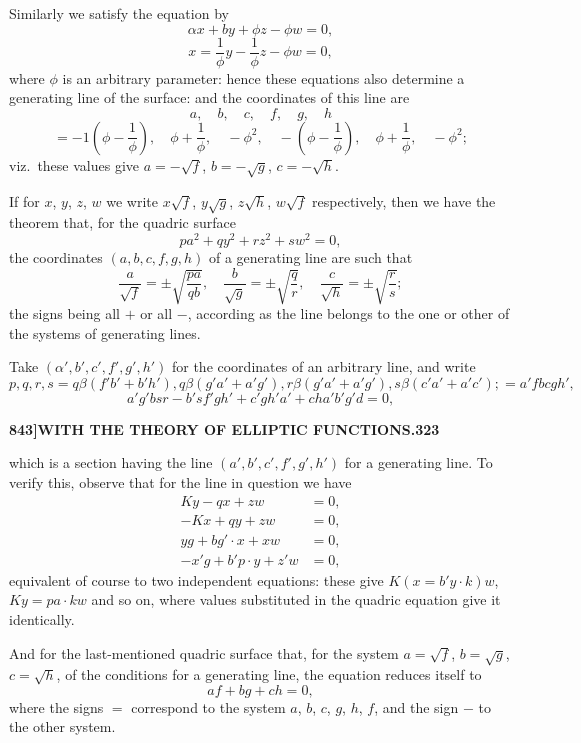 \documentclass[12pt,a4paper]{article}
\theoremstyle{definition}
\begin{document}
Similarly we satisfy the equation by
\[
\alpha x + by + \phi z - \phi w = 0,
\]
\[
x = \frac{1}{\phi}y - \frac{1}{\phi}z - \phi w = 0,
\]
where $\phi$ is an arbitrary parameter: hence these equations also determine a generating line of the surface: and the coordinates of this line are
\[
a, \quad b, \quad c, \quad f, \quad g, \quad h
\]
\[
= -1\left(\phi - \frac{1}{\phi}\right), \quad \phi + \frac{1}{\phi}, \quad -\phi^2, \quad -\left(\phi - \frac{1}{\phi}\right), \quad \phi + \frac{1}{\phi}, \quad -\phi^2;
\]
viz.\ these values give $a = -\sqrt{f}$, $b = -\sqrt{g}$, $c = -\sqrt{h}$.

If for $x$, $y$, $z$, $w$ we write $x\sqrt{f}$, $y\sqrt{g}$, $z\sqrt{h}$, $w\sqrt{f}$ respectively, then we have the theorem that, for the quadric surface
\[
pa^2 + qy^2 + rz^2 + sw^2 = 0,
\]
the coordinates $(a, b, c, f, g, h)$ of a generating line are such that
\[
\frac{a}{\sqrt{f}} = \pm \sqrt{\frac{pa}{qb}}, \quad \frac{b}{\sqrt{g}} = \pm \sqrt{\frac{q}{r}}, \quad \frac{c}{\sqrt{h}} = \pm \sqrt{\frac{r}{s}};
\]
the signs being all $+$ or all $-$, according as the line belongs to the one or other of the systems of generating lines.

Take $(\alpha', b', c', f', g', h')$ for the coordinates of an arbitrary line, and write
\[
p, q, r, s = q\beta(f'b' + b'h'), q\beta(g'a' + a'g'), r\beta(g'a' + a'g'), s\beta(c'a' + a'c'); = a'fbcgh',
\]
\[
a'g'bsr - b'sf'gh' + c'gh'a' + cha'b'g'd = 0,
\]

\newpage
\setcounter{page}{323}

\noindent\textbf{843]}\hfill\textbf{WITH THE THEORY OF ELLIPTIC FUNCTIONS.}\hfill\textbf{323}

\bigskip

\noindent which is a section having the line $(a', b', c', f', g', h')$ for a generating line. To verify this, observe that for the line in question we have
\begin{align*}
Ky - qx + zw &= 0, \\
-Kx + qy + zw &= 0, \\
yg + bg' \cdot x + xw &= 0, \\
-x'g + b'p \cdot y + z'w &= 0,
\end{align*}
equivalent of course to two independent equations: these give $K(x = b'y \cdot k)w$, $Ky = pa \cdot kw$ and so on, where values substituted in the quadric equation give it identically.

And for the last-mentioned quadric surface that, for the system $a = \sqrt{f}$, $b = \sqrt{g}$, $c = \sqrt{h}$, of the conditions for a generating line, the equation reduces itself to
\[
af + bg + ch = 0,
\]
where the signs $=$ correspond to the system $a$, $b$, $c$, $g$, $h$, $f$, and the sign $-$ to the other system.
\end{document}
